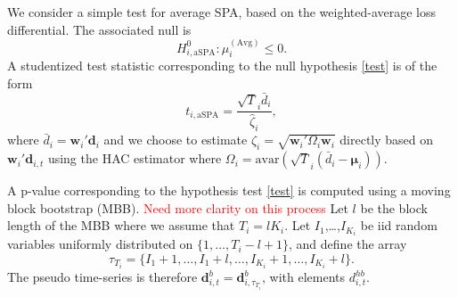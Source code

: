 \documentclass[11pt]{article}
\def\mbf#1{\mathbf{#1}} %
\theoremstyle{definition}
\begin{document}
We consider a simple test for average SPA, based on the weighted-average loss differential. The associated null is
\begin{equation} \label{test}
	H_{i,\text{aSPA}}^0: \mu^{(\text{Avg})}_i \leq 0.
\end{equation}
A studentized test statistic corresponding to the null hypothesis \eqref{test} is of the form 
\begin{equation} \label{tstat}
	t_{i,\text{aSPA}} = \frac{\sqrt{T}_i\bar{d}_{i}}{\hat{\zeta}_{i}},
\end{equation}
where $\bar{d}_{i} = \textbf{w}_i'\textbf{d}_{i}$ and we choose to estimate $\zeta_{i} = \sqrt{\textbf{w}_i'\Omega_{i}\textbf{w}_i}$ directly based on $\textbf{w}_i'\textbf{d}_{i,t}$ using the HAC estimator \citep{giacomini2006tests} where $\Omega_{i} = \text{avar}\left(\sqrt{T}_i(\bar{d}_{i} - \mbf{\mu}_{i})\right)$. 

A p-value corresponding to the hypothesis test \eqref{test} is computed using a moving block bootstrap (MBB). \textcolor{red}{Need more clarity on this process}
Let $l$ be the block length of the MBB where we assume that $T_i = lK_i$. Let $I_1$,\ldots,$I_{K_i}$ be iid random variables uniformly distributed on $\{1,\ldots,T_i-l+1\}$, and define the array 
$$
  \tau_{T_i} = \{I_1+1, \ldots, I_1+l, \ldots, I_{K_i}+1, \ldots, I_{K_i}+l\}.
$$
The pseudo time-series is therefore $\textbf{d}^b_{i,t} = \textbf{d}^b_{i,\tau_{T_i}}$, with elements $d^{hb}_{i,t}$.
\end{document}
